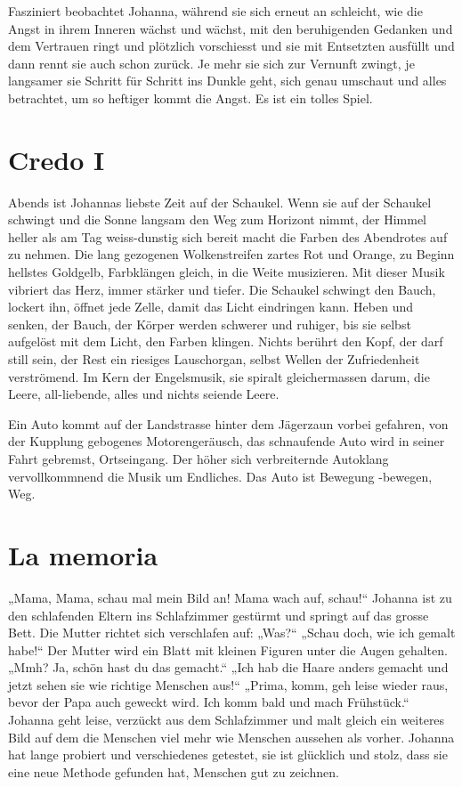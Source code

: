 \documentclass[10pt,titlepage,a5paper]{book}
\begin{document}
Fasziniert beobachtet Johanna, während sie sich erneut an schleicht, wie die Angst in ihrem Inneren wächst und wächst, mit den beruhigenden Gedanken und dem Vertrauen ringt und plötzlich vorschiesst und sie mit Entsetzten ausfüllt und dann rennt sie auch schon zurück. Je mehr sie sich zur Vernunft zwingt, je langsamer sie Schritt für Schritt ins Dunkle geht, sich genau umschaut und alles betrachtet, um so heftiger kommt die Angst.
Es ist ein tolles Spiel.



\section*{Credo I}



Abends ist Johannas liebste Zeit auf der Schaukel. Wenn sie auf der Schaukel schwingt und die  Sonne langsam den Weg zum Horizont nimmt, der Himmel heller als am Tag weiss-dunstig sich bereit macht die Farben des Abendrotes auf zu nehmen. Die lang gezogenen Wolkenstreifen zartes Rot und Orange, zu Beginn hellstes Goldgelb, Farbklängen gleich, in die Weite musizieren. Mit dieser Musik vibriert das Herz, immer stärker und tiefer. Die Schaukel schwingt den Bauch, lockert ihn, öffnet jede Zelle, damit das Licht eindringen kann. Heben und senken, der Bauch, der Körper werden schwerer und ruhiger, bis sie selbst aufgelöst mit dem Licht, den Farben klingen. 
Nichts berührt den Kopf, der darf still sein, der Rest ein riesiges Lauschorgan, selbst Wellen der Zufriedenheit verströmend. Im Kern der Engelsmusik, sie spiralt gleichermassen darum, die Leere, all-liebende, alles und nichts seiende Leere.

Ein Auto kommt auf der Landstrasse hinter dem Jägerzaun vorbei gefahren, von der Kupplung gebogenes Motorengeräusch, das schnaufende Auto wird in seiner Fahrt gebremst, Ortseingang. Der höher sich verbreiternde Autoklang vervollkommnend die Musik um Endliches. Das Auto ist Bewegung -bewegen, Weg.
 


\section*{La memoria}



„Mama, Mama, schau mal mein Bild an! Mama wach auf, schau!“ Johanna ist zu den schlafenden Eltern ins Schlafzimmer gestürmt und springt auf das grosse Bett. Die Mutter richtet sich verschlafen auf: „Was?“ „Schau doch, wie ich gemalt habe!“ Der Mutter wird ein Blatt mit kleinen Figuren unter die Augen gehalten. „Mmh? Ja, schön hast du das gemacht.“ „Ich hab die Haare anders gemacht und jetzt sehen sie wie richtige Menschen aus!“ „Prima, komm, geh leise wieder raus, bevor der Papa auch geweckt wird. Ich komm bald und mach Frühstück.“ Johanna geht leise, verzückt aus dem Schlafzimmer und malt gleich ein weiteres Bild auf dem die Menschen viel mehr wie Menschen aussehen als vorher. Johanna hat lange probiert und verschiedenes getestet, sie ist glücklich und stolz, dass sie eine neue Methode gefunden hat, Menschen gut zu zeichnen.
\end{document}
